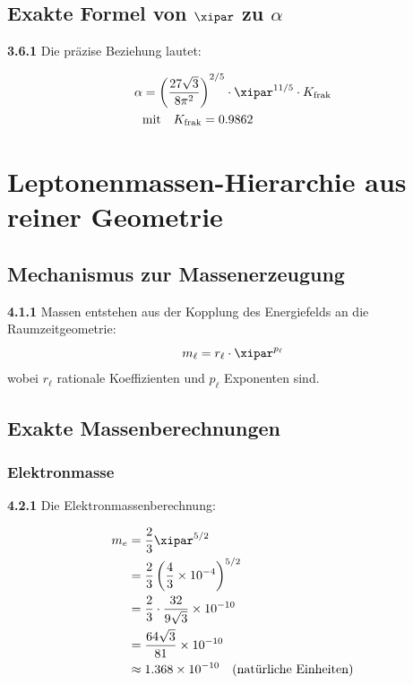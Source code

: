 	\subsection{Exakte Formel von $\xipar$ zu $\alpha$}
	
	\noindent \textbf{3.6.1} Die präzise Beziehung lautet:
	\begin{keyresult}
		\begin{align}
			\alpha &= \left( \frac{27 \sqrt{3}}{8 \pi^2} \right)^{2/5} \cdot \xipar^{11/5} \cdot K_{\text{frak}} \\
			&\text{mit} \quad K_{\text{frak}} = 0.9862
		\end{align}
	\end{keyresult}
	
	\section{Leptonenmassen-Hierarchie aus reiner Geometrie}
	
	\subsection{Mechanismus zur Massenerzeugung}
	
	\noindent \textbf{4.1.1} Massen entstehen aus der Kopplung des Energiefelds an die Raumzeitgeometrie:
	\begin{equation}
		m_{\ell} = r_{\ell} \cdot \xipar^{p_{\ell}}
	\end{equation}
	wobei $r_{\ell}$ rationale Koeffizienten und $p_{\ell}$ Exponenten sind.
	
	\subsection{Exakte Massenberechnungen}
	
	\subsubsection{Elektronmasse}
	
	\noindent \textbf{4.2.1} Die Elektronmassenberechnung:
	\begin{keyresult}
		\begin{align}
			m_e &= \frac{2}{3} \xipar^{5/2} \\
			&= \frac{2}{3} \left( \frac{4}{3} \times 10^{-4} \right)^{5/2} \\
			&= \frac{2}{3} \cdot \frac{32}{9 \sqrt{3}} \times 10^{-10} \\
			&= \frac{64 \sqrt{3}}{81} \times 10^{-10} \\
			&\approx 1.368 \times 10^{-10} \quad \text{(natürliche Einheiten)}
		\end{align}
	\end{keyresult}
	
